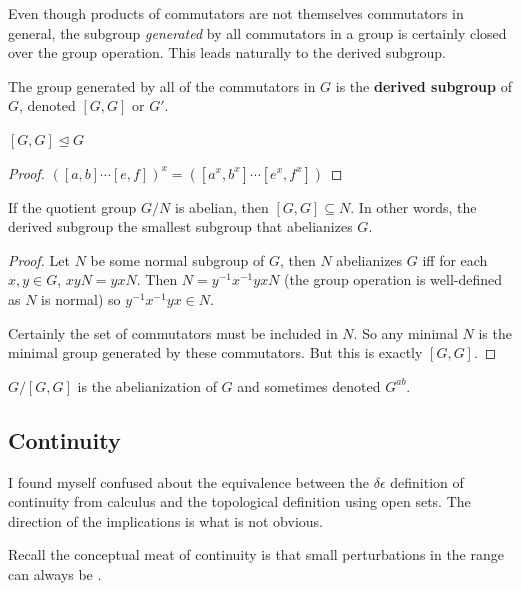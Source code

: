 \documentclass[10pt]{article}
\begin{document}
\begin{definition}
\begin{definition}
Even though products of commutators are not themselves commutators in general,
the subgroup \textit{generated} by all commutators in a group is certainly closed over
the group operation. This leads naturally to the derived subgroup.

\begin{definition}
	The group generated by all of the commutators in $G$ is the \textbf{derived
	subgroup} of $G$, denoted $[G, G]$ or $G'$.
\end{definition}

\begin{theorem}
	$[G, G] \trianglelefteq G$
\end{theorem}

\begin{proof}
	$([a, b] \cdots [e, f])^x = ([a^x, b^x] \cdots [e^x, f^x])$
\end{proof}

\begin{theorem}
	If the quotient group $G / N$ is abelian, then $[G, G] \subseteq N$. In other
	words, the derived subgroup the smallest subgroup that abelianizes $G$.
\end{theorem}

\begin{proof}
	Let $N$ be some normal subgroup of $G$, then $N$ abelianizes $G$ iff for each
	$x, y \in G$, $xyN = yxN$. Then $N = y^{-1}x^{-1}yxN$ (the group operation is
	well-defined as $N$ is normal) so $y^{-1}x^{-1}yx \in N$. 

	Certainly the set of commutators must be included in $N$. So any minimal $N$
	is the minimal group generated by these commutators. But this is exactly $[G,
	G]$.
\end{proof}

\begin{definition}
	$G / [G, G]$ is the abelianization of $G$ and sometimes denoted $G^{ab}$.
\end{definition}


\subsection{Continuity}

I found myself confused about the equivalence between the $\delta \epsilon$
definition of continuity from calculus and the topological definition using
open sets. The direction of the implications is what is not obvious.

Recall the conceptual meat of continuity is that small perturbations in the
range can always be . 


\end{definition}
\end{definition}
\end{document}
